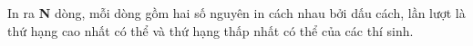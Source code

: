 In ra \textbf{N} dòng, mỗi dòng gồm hai số nguyên in cách nhau bởi dấu cách, lần lượt là thứ hạng cao nhất có thể và thứ hạng thấp nhất có thể của các thí sinh.